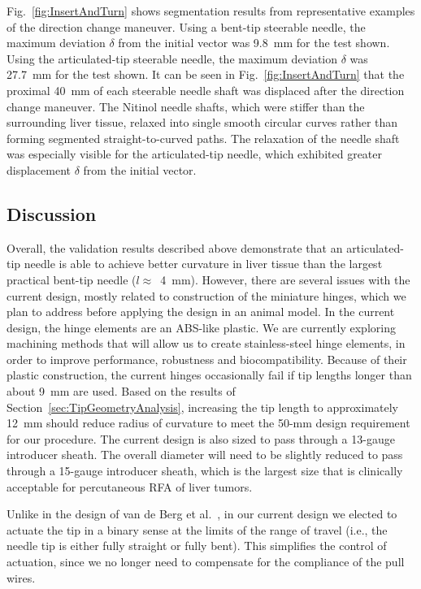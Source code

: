 Fig.~\ref{fig:InsertAndTurn} shows segmentation results from representative examples of the direction change maneuver. Using a bent-tip steerable needle, the maximum deviation $\delta$ from the initial vector was 9.8~mm for the test shown. Using the articulated-tip steerable needle, the maximum deviation $\delta$ was 27.7~mm for the test shown. It can be seen in Fig.~\ref{fig:InsertAndTurn} that the proximal 40~mm of each steerable needle shaft was displaced after the direction change maneuver. The Nitinol needle shafts, which were stiffer than the surrounding liver tissue, relaxed into single smooth circular curves rather than forming segmented straight-to-curved paths. The relaxation of the needle shaft was especially visible for the articulated-tip needle, which exhibited greater displacement $\delta$ from the initial vector.

\subsection{Discussion}
\label{sec:ArticDiscussion}
Overall, the validation results described above demonstrate that an articulated-tip needle is able to achieve better curvature in liver tissue than the largest practical bent-tip needle ($l \approx$~4~mm). However, there are several issues with the current design, mostly related to construction of the miniature hinges, which we plan to address before applying the design in an animal model. In the current design, the hinge elements are an ABS-like plastic. We are currently exploring machining methods that will allow us to create stainless-steel hinge elements, in order to improve performance, robustness and biocompatibility. Because of their plastic construction, the current hinges occasionally fail if tip lengths longer than about 9~mm are used. Based on the results of Section~\ref{sec:TipGeometryAnalysis}, increasing the tip length to approximately 12~mm should reduce radius of curvature to meet the 50-mm design requirement for our procedure. The current design is also sized to pass through a 13-gauge introducer sheath. The overall diameter will need to be slightly reduced to pass through a 15-gauge introducer sheath, which is the largest size that is clinically acceptable for percutaneous RFA of liver tumors.

Unlike in the design of van de Berg et al.~\cite{vandeBerg2015}, in our current design we elected to actuate the tip in a binary sense at the limits of the range of travel (i.e., the needle tip is either fully straight or fully bent). This simplifies the control of actuation, since we no longer need to compensate for the compliance of the pull wires. 

